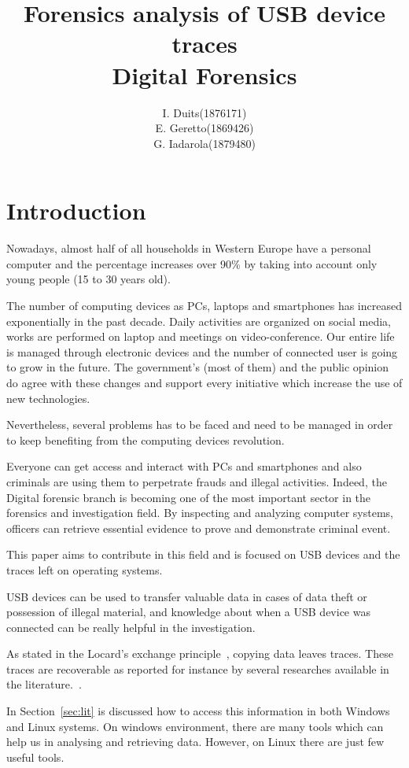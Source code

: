 \documentclass[a4paper]{article}
\title{Forensics analysis of USB device traces\\
\large Digital Forensics}
\author{
\begin{tabular}{>{\raggedleft}m{5cm}m{5cm}}
I. Duits & (1876171) \\
E. Geretto & (1869426) \\
G. Iadarola & (1879480) \\
\end{tabular}
}
\begin{document}
\maketitle

\section{Introduction}
Nowadays, almost half of all households in Western Europe have a personal
computer and the percentage increases over 90\% by taking into account only
young people (15 to 30 years old).

The number of computing devices as PCs, laptops and smartphones has increased
exponentially in the past decade. Daily activities are organized on social
media, works are performed on laptop and meetings on video-conference. Our
entire life is managed through electronic devices and the number of connected
user is going to grow in the future. The government's (most of them) and the
public opinion do agree with these changes and support every initiative which
increase the use of new technologies.

Nevertheless, several problems has to be faced and need to be managed in order
to keep benefiting from the computing devices revolution.

Everyone can get access and interact with PCs and smartphones and also criminals
are using them to perpetrate frauds and illegal activities. Indeed, the Digital
forensic branch is becoming one of the most important sector in the forensics
and investigation field. By inspecting and analyzing computer systems, officers
can retrieve essential evidence to prove and demonstrate criminal event.

This paper aims to contribute in this field and is focused on USB devices and
the traces left on operating systems.

USB devices can be used to transfer valuable data in cases of data theft or
possession of illegal material, and knowledge about when a USB device was
connected can be really helpful in the investigation.

As stated in the Locard's exchange principle~\cite{locard2008locard}, copying
data leaves traces. These traces are recoverable as reported for instance by
several researches available in the literature.~\cite{Tanushree12,Abhijeet14}.

In Section~\ref{sec:lit} is discussed how to access this information in both
Windows and Linux systems. On windows environment, there are many tools which
can help us in analysing and retrieving data. However, on Linux there are just
few useful tools.
\end{document}
